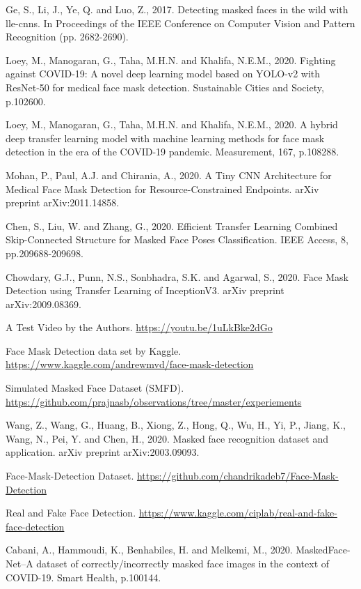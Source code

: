\documentclass{svproc}
\begin{document}
\begin{thebibliography}{10}
%
Ge, S., Li, J., Ye, Q. and Luo, Z., 2017. Detecting masked faces in the wild with lle-cnns. In Proceedings of the IEEE Conference on Computer Vision and Pattern Recognition (pp. 2682-2690).

Loey, M., Manogaran, G., Taha, M.H.N. and Khalifa, N.E.M., 2020. Fighting against COVID-19: A novel deep learning model based on YOLO-v2 with ResNet-50 for medical face mask detection. Sustainable Cities and Society, p.102600.

Loey, M., Manogaran, G., Taha, M.H.N. and Khalifa, N.E.M., 2020. A hybrid deep transfer learning model with machine learning methods for face mask detection in the era of the COVID-19 pandemic. Measurement, 167, p.108288.

Mohan, P., Paul, A.J. and Chirania, A., 2020. A Tiny CNN Architecture for Medical Face Mask Detection for Resource-Constrained Endpoints. arXiv preprint arXiv:2011.14858.

Chen, S., Liu, W. and Zhang, G., 2020. Efficient Transfer Learning Combined Skip-Connected Structure for Masked Face Poses Classification. IEEE Access, 8, pp.209688-209698.

Chowdary, G.J., Punn, N.S., Sonbhadra, S.K. and Agarwal, S., 2020. Face Mask Detection using Transfer Learning of InceptionV3. arXiv preprint arXiv:2009.08369.

A Test Video by the Authors. \url{https://youtu.be/1uLkBke2dGo}

Face Mask Detection data set by Kaggle. \url{https://www.kaggle.com/andrewmvd/face-mask-detection}

Simulated Masked Face Dataset (SMFD). \url{https://github.com/prajnasb/observations/tree/master/experiements}

Wang, Z., Wang, G., Huang, B., Xiong, Z., Hong, Q., Wu, H., Yi, P., Jiang, K., Wang, N., Pei, Y. and Chen, H., 2020. Masked face recognition dataset and application. arXiv preprint arXiv:2003.09093.

 Face-Mask-Detection Dataset. \url{https://github.com/chandrikadeb7/Face-Mask-Detection}

Real and Fake Face Detection. \url{https://www.kaggle.com/ciplab/real-and-fake-face-detection}

Cabani, A., Hammoudi, K., Benhabiles, H. and Melkemi, M., 2020. MaskedFace-Net–A dataset of correctly/incorrectly masked face images in the context of COVID-19. Smart Health, p.100144.

\end{thebibliography}
\end{document}

